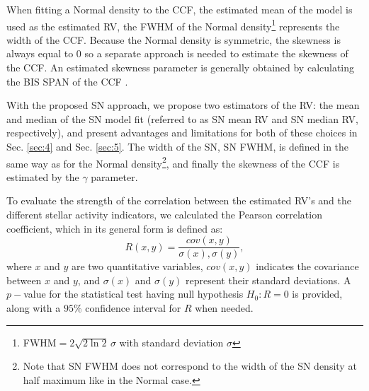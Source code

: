 \documentclass{aa}
\begin{document}

When fitting a Normal density to the CCF, the estimated mean of the model is used as the estimated RV, the FWHM of the Normal density\footnote{FWHM$=2\sqrt{2\ln2}\,\sigma$ with standard deviation $\sigma$} represents the width of the CCF.
Because the Normal density is symmetric, the skewness is always equal to 0 so a separate approach is needed to estimate the skewness of the CCF.
An estimated skewness parameter is generally obtained by calculating the BIS SPAN of the CCF \citep[see Sect. \ref{intro}, and e.g.][]{Queloz-2001}. 
%

With the proposed SN approach, we propose two estimators of the RV: the mean and median of the SN model fit (referred to as SN mean RV and SN median RV, respectively), and present advantages and limitations for both of these choices in Sec. \ref{sec:4} and Sec. \ref{sec:5}. 
The width of the SN, SN FWHM, is defined in the same way as for the Normal density\footnote{Note that SN FWHM does not correspond to the width of the SN density at half maximum like in the Normal case.}, and finally the skewness of the CCF is estimated by the $\gamma$ parameter.

To evaluate the strength of the correlation between the estimated RV's and the different stellar activity indicators, we calculated the Pearson correlation coefficient, which in its general form is defined as:
%
\begin{equation}
R (x,y)= \frac{cov(x,y)}{\sigma(x),\sigma(y)},
\label{eq:Pearson:corr}
\end{equation}
%
where $x$ and $y$ are two quantitative variables, $cov(x,y)$ indicates the covariance between $x$ and $y$, and $\sigma(x)$ and $\sigma(y)$ represent their standard deviations.  A $p-$value for the statistical test having null hypothesis $H_{0}: R=0$ is provided, along with a $95\%$ confidence interval for $R$ when needed.
\end{document}
